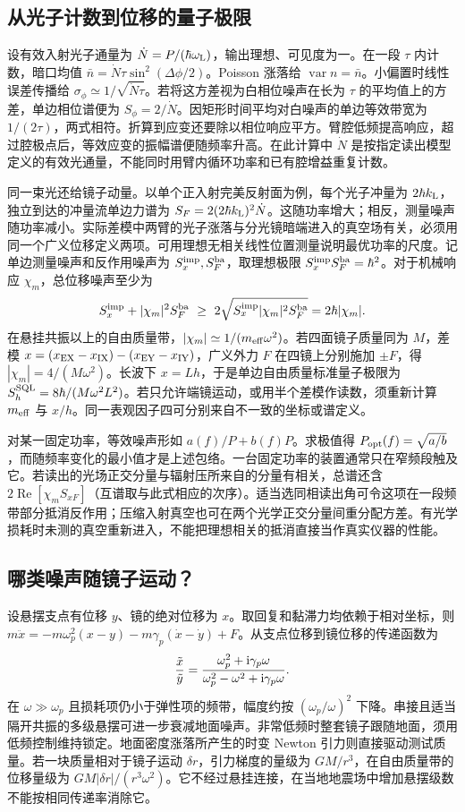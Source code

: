 \subsection{从光子计数到位移的量子极限}
设有效入射光子通量为 $\dot N=P/(\hbar\omega_{\rm L})$，输出理想、可见度为一。在一段 $\tau$ 内计数，暗口均值 $\bar n=\dot N\tau\sin^2(\Delta\phi/2)$。Poisson 涨落给 $\operatorname{var} n=\bar n$。小偏置时线性误差传播给 $\sigma_\phi\simeq1/\sqrt{\dot N\tau}$。若将这方差视为白相位噪声在长为 $\tau$ 的平均值上的方差，单边相位谱便为 $S_\phi=2/\dot N$。因矩形时间平均对白噪声的单边等效带宽为 $1/(2\tau)$，两式相符。折算到应变还要除以相位响应平方。臂腔低频提高响应，超过腔极点后，等效应变的振幅谱便随频率升高。在此计算中 $\dot N$ 是按指定读出模型定义的有效光通量，不能同时用臂内循环功率和已有腔增益重复计数。

同一束光还给镜子动量。以单个正入射完美反射面为例，每个光子冲量为 $2\hbar k_{\rm L}$，独立到达的冲量流单边力谱为 $S_F=2(2\hbar k_{\rm L})^2\dot N$。这随功率增大；相反，测量噪声随功率减小。实际差模中两臂的光子涨落与分光镜暗端进入的真空场有关，必须用同一个广义位移定义两项。可用理想无相关线性位置测量说明最优功率的尺度。记单边测量噪声和反作用噪声为 $S_x^{\rm imp},S_F^{\rm ba}$，取理想极限 $S_x^{\rm imp}S_F^{\rm ba}=\hbar^2$。对于机械响应 $\chi_m$，总位移噪声至少为
\[
 S_x^{\rm imp}+|\chi_m|^2S_F^{\rm ba}
 \ \ge\ 2\sqrt{S_x^{\rm imp}|\chi_m|^2 S_F^{\rm ba}}
 =2\hbar|\chi_m| .
\]
在悬挂共振以上的自由质量带，$|\chi_m|\simeq1/(m_{\rm eff}\omega^2)$。若四面镜子质量同为 $M$，差模 $x=(x_{\rm EX}-x_{\rm IX})-(x_{\rm EY}-x_{\rm IY})$，广义外力 $F$ 在四镜上分别施加 $\pm F$，得 $|\chi_m|=4/(M\omega^2)$。长波下 $x=Lh$，于是单边自由质量标准量子极限为 $S_h^{\rm SQL}=8\hbar/(M\omega^2L^2)$。若只允许端镜运动，或用半个差模作读数，须重新计算 $m_{\rm eff}$ 与 $x/h$。同一表观因子四可分别来自不一致的坐标或谱定义。

对某一固定功率，等效噪声形如 $a(f)/P+b(f)P$。求极值得 $P_{\rm opt}(f)=\sqrt{a/b}$，而随频率变化的最小值才是上述包络。一台固定功率的装置通常只在窄频段触及它。若读出的光场正交分量与辐射压所来自的分量有相关，总谱还含 $2\operatorname{Re}[\chi_m S_{xF}]$（互谱取与此式相应的次序）。适当选同相读出角可令这项在一段频带部分抵消反作用；压缩入射真空也可在两个光学正交分量间重分配方差。有光学损耗时未测的真空重新进入，不能把理想相关的抵消直接当作真实仪器的性能。

\subsection{哪类噪声随镜子运动？}
设悬摆支点有位移 $y$、镜的绝对位移为 $x$。取回复和黏滞力均依赖于相对坐标，则 $m\ddot x=-m\omega_p^2(x-y)-m\gamma_p(\dot x-\dot y)+F$。从支点位移到镜位移的传递函数为
\[
 \frac{\tilde x}{\tilde y}=
 \frac{\omega_p^2+\mathrm{i}\gamma_p\omega}{\omega_p^2-\omega^2+\mathrm{i}\gamma_p\omega}.
\]
在 $\omega\gg\omega_p$ 且损耗项仍小于弹性项的频带，幅度约按 $(\omega_p/\omega)^2$ 下降。串接且适当隔开共振的多级悬摆可进一步衰减地面噪声。非常低频时整套镜子跟随地面，须用低频控制维持锁定。地面密度涨落所产生的时变 Newton 引力则直接驱动测试质量。若一块质量相对于镜子运动 $\delta r$，引力梯度的量级为 $GM/r^3$，在自由质量带的位移量级为 $GM|\delta r|/(r^3\omega^2)$。它不经过悬挂连接，在当地地震场中增加悬摆级数不能按相同传递率消除它。

